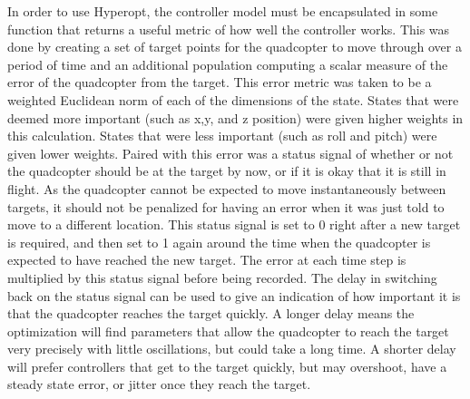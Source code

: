 \documentclass[letterpaper,12pt,titlepage,oneside,final]{book}
\begin{document}
In order to use Hyperopt, the controller model must be encapsulated in some function that returns a useful metric of how well the controller works. This was done by creating a set of target points for the quadcopter to move through over a period of time and an additional population computing a scalar measure of the error of the quadcopter from the target. This error metric was taken to be a weighted Euclidean norm of each of the dimensions of the state. States that were deemed more important (such as x,y, and z position) were given higher weights in this calculation. States that were less important (such as roll and pitch) were given lower weights. 
Paired with this error was a status signal of whether or not the quadcopter should be at the target by now, or if it is okay that it is still in flight. 
As the quadcopter cannot be expected to move instantaneously between targets, it should not be penalized for having an error when it was just told to move to a different location. 
This status signal is set to 0 right after a new target is required, and then set to 1 again around the time when the quadcopter is expected to have reached the new target. The error at each time step is multiplied by this status signal before being recorded. 
The delay in switching back on the status signal can be used to give an indication of how important it is that the quadcopter reaches the target quickly. 
A longer delay means the optimization will find parameters that allow the quadcopter to reach the target very precisely with little oscillations, but could take a long time. 
A shorter delay will prefer controllers that get to the target quickly, but may overshoot, have a steady state error, or jitter once they reach the target.
\end{document}
